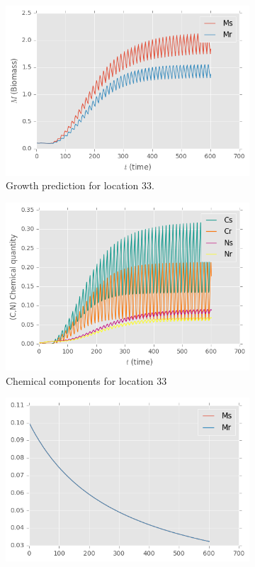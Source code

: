 \documentclass[paper=a4, fontsize=11pt]{scrartcl}
\numberwithin{equation}{section}		%
\numberwithin{figure}{section}			%
\numberwithin{table}{section}				%
\begin{document}
\begin{figure}[ht]
\begin{subfigure}{.5\textwidth}
\includegraphics[scale=0.5]{growth.png}
\caption{Growth prediction for location 33.}
\label{loc-33-growth}
\end{subfigure}
\begin{subfigure}{.5\textwidth}
\includegraphics[scale=0.5]{loc-33-cc.png}
\caption{Chemical components for location 33}
\label{loc-33-cc}
\end{subfigure}
\begin{subfigure}{.5\textwidth}
\includegraphics[scale=0.5]{inhibition.png}

\end{subfigure}
\end{figure}
\end{document}
